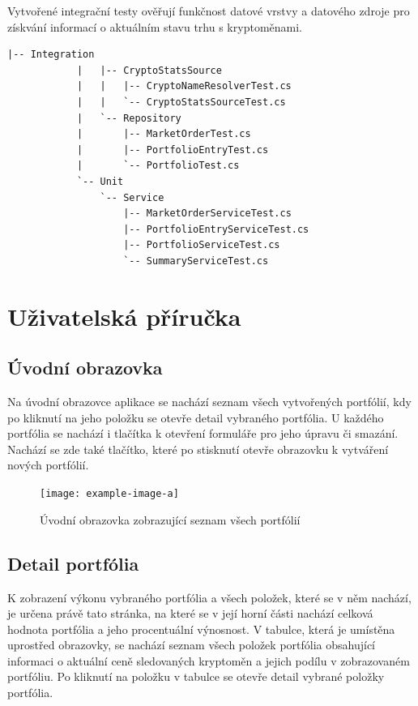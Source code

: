 \documentclass[12pt, a4paper]{article}
\begin{document}
    Vytvořené integrační testy ověřují funkčnost datové vrstvy a datového zdroje pro získvání informací o aktuálním stavu trhu s kryptoměnami.

    \begin{lstlisting}[caption={Struktura projektu \texttt{Tests} obsahující integrační a jednotkové testy}, captionpos=b]
            |-- Integration
            |   |-- CryptoStatsSource
            |   |   |-- CryptoNameResolverTest.cs
            |   |   `-- CryptoStatsSourceTest.cs
            |   `-- Repository
            |       |-- MarketOrderTest.cs
            |       |-- PortfolioEntryTest.cs
            |       `-- PortfolioTest.cs
            `-- Unit
                `-- Service
                    |-- MarketOrderServiceTest.cs
                    |-- PortfolioEntryServiceTest.cs
                    |-- PortfolioServiceTest.cs
                    `-- SummaryServiceTest.cs
    \end{lstlisting}
    
    \section{Uživatelská příručka}
    
    \subsection{Úvodní obrazovka}
    Na úvodní obrazovce aplikace se nachází seznam všech vytvořených portfólií, kdy po kliknutí na jeho položku se otevře detail vybraného portfólia.
    U každého portfólia se nachází i tlačítka k otevření formuláře pro jeho úpravu či smazání.
    Nachází se zde také tlačítko, které po stisknutí otevře obrazovku k vytváření nových portfólií.

    \begin{figure}[!ht]
        \centering
        {\texttt{[image: example-image-a]}}
        \caption{Úvodní obrazovka zobrazující seznam všech portfólií}
        \label{fig:portfolio-list}
    \end{figure}

    \subsection{Detail portfólia}
    K zobrazení výkonu vybraného portfólia a všech položek, které se v něm nachází, je určena právě tato stránka,
    na které se v její horní části nachází celková hodnota portfólia a jeho procentuální výnosnost.
    V tabulce, která je umístěna uprostřed obrazovky, se nachází seznam všech položek portfólia obsahující informaci o
    aktuální ceně sledovaných kryptoměn a jejich podílu v zobrazovaném portfóliu.
    Po kliknutí na položku v tabulce se otevře detail vybrané položky portfólia.
\end{document}
